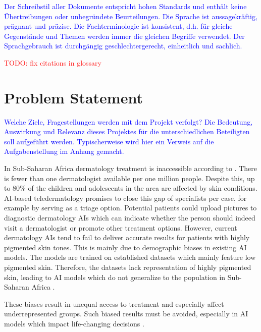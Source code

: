 \documentclass[12pt, a4paper, oneside]{book}   	%
\renewcommand{\todo}[1]{\textcolor{red}{TODO: #1}}
\newcommand{\baaCriteria}[1]{\textcolor{blue}{#1}}
\begin{document}
	
	\baaCriteria{Der Schreibstil aller Dokumente entspricht hohen Standards und enthält keine Übertreibungen oder unbegründete Beurteilungen. Die Sprache ist aussagekräftig, prägnant und präzise. Die Fachterminologie ist konsistent, d.h. für gleiche Gegenstände und Themen werden immer die gleichen Begriffe verwendet. Der Sprachgebrauch ist durchgängig geschlechtergerecht, einheitlich und sachlich.}
	
	\listoffigures
	\listoftables
	\printnoidxglossaries
	
	\todo{fix citations in glossary}
	
	\mainmatter
	
	
	\chapter{Problem Statement}
		\baaCriteria{Welche Ziele, Fragestellungen werden mit dem Projekt verfolgt? Die Bedeutung, Auswirkung und Relevanz dieses Projektes für die unterschiedlichen Beteiligten soll aufgeführt werden. Typischerweise wird hier ein Verweis auf die Aufgabenstellung im Anhang gemacht.}
		
		In Sub-Saharan Africa dermatology treatment is inaccessible according to \textcite{Gottfrois2024}. There is fewer than one dermatologist available per one million people. Despite this, up to 80\% of the children and adolescents in the area are affected by skin conditions. AI-based \gls{teledermatology} promises to close this gap of specialists per case, for example by serving as a triage option. Potential patients could upload pictures to diagnostic dermatology AIs which can indicate whether the person should indeed visit a dermatologist or promote other treatment options. However, current dermatology AIs tend to fail to deliver accurate results for patients with highly pigmented skin tones. This is mainly due to demographic biases in existing AI models. The models are trained on established datasets which mainly feature low pigmented skin. Therefore, the datasets lack representation of highly pigmented skin, leading to AI models which do not generalize to the population in Sub-Saharan Africa \autocite{Gottfrois2024}.
		
		These biases result in unequal access to treatment and especially affect underrepresented groups. Such biased results must be avoided, especially in AI models which impact life-changing decisions \autocite{Mehrabi_2021}.
		
\end{document}
